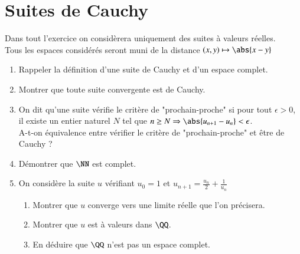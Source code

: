 \documentclass[oneside,12pt]{article}
\let\oldsection\section
\renewcommand{\section}{\newpage\oldsection}
\begin{document}



\section{Suites de Cauchy}
Dans tout l'exercice on considèrera uniquement des suites à valeurs réelles.\\
Tous les espaces considérés seront muni de la distance $(x,y)\mapsto \abs{x-y}$

\begin{enumerate}
	\item Rappeler la définition d'une suite de Cauchy et d'un espace complet.
	\item Montrer que toute suite convergente est de Cauchy.
	\item On dit qu'une suite vérifie le critère de "prochain-proche" si pour tout $\epsilon>0$, il existe un entier naturel $N$ tel que $n\geq N \Rightarrow \abs{u_{n+1}-u_n}<\epsilon$. \\
	A-t-on équivalence entre vérifier le critère de "prochain-proche" et être de Cauchy ?
	\item Démontrer que $\NN$ est complet.
	\item On considère la suite $u$ vérifiant $u_0=1$ et $u_{n+1}=\frac{u_n}{2}+\frac{1}{u_n}$
		\begin{enumerate}
			\item Montrer que $u$ converge vers une limite réelle que l'on précisera.
			\item Montrer que $u$ est à valeurs dans $\QQ$.
			\item En déduire que $\QQ$ n'est pas un espace complet.
		\end{enumerate}
\end{enumerate}
\end{document}
